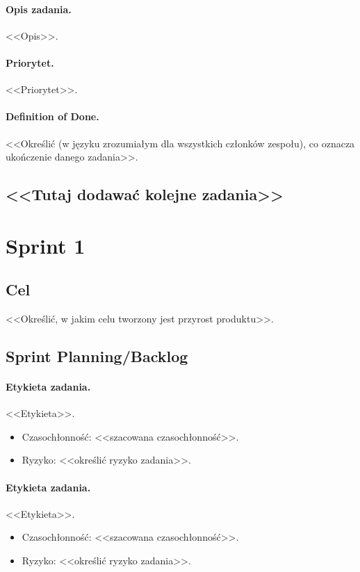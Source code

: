 \documentclass[a4paper]{article}
\begin{document}
\paragraph{Opis zadania.} <<Opis>>.
\paragraph{Priorytet.} <<Priorytet>>.
\paragraph{Definition of Done.} <<Określić (w języku zrozumiałym dla wszystkich członków zespołu), co oznacza ukończenie danego zadania>>.

\subsection*{<<Tutaj dodawać kolejne zadania>>}

\section{Sprint 1}
\subsection{Cel} <<Określić, w jakim celu tworzony jest przyrost produktu>>.
\subsection{Sprint Planning/Backlog}

\paragraph{Etykieta zadania.} <<Etykieta>>.
\begin{itemize}
\item Czasochłonność: <<szacowana czasochłonność>>.
\item{Ryzyko:} <<określić ryzyko zadania>>.
\end{itemize}

\paragraph{Etykieta zadania.} <<Etykieta>>.
\begin{itemize}
\item Czasochłonność: <<szacowana czasochłonność>>.
\item{Ryzyko:} <<określić ryzyko zadania>>.
\end{itemize}
\end{document}
